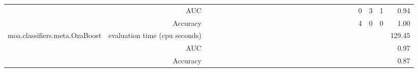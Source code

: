 \documentclass{article}
\providecommand{\tabularnewline}{\\}
\begin{document}
\begin{sidewaystable}
\begin{tabular}{|r|r|rrrrrrrr|r|r|r|r|r|r|r|r|r|r|r|r|r|r|r|r|r|}
 \cline{2-2} \cline{24-27}
 & AUC & \multicolumn{1}{r}{} & \multicolumn{1}{r}{} & \multicolumn{1}{r}{} & \multicolumn{1}{r}{} & \multicolumn{1}{r}{} & \multicolumn{1}{r}{} & \multicolumn{1}{r}{} & \multicolumn{1}{r}{} & \multicolumn{1}{r}{} & \multicolumn{1}{r}{} & \multicolumn{1}{r}{} & \multicolumn{1}{r}{} & \multicolumn{1}{r}{} & \multicolumn{1}{r}{} & \multicolumn{1}{r}{} & \multicolumn{1}{r}{} & \multicolumn{1}{r}{} & \multicolumn{1}{r}{} & \multicolumn{1}{r}{} & \multicolumn{1}{r}{} & \multicolumn{1}{r|}{} & \multicolumn{1}{r|}{0} & \multicolumn{1}{r|}{3} & \multicolumn{1}{r|}{1} & 0.94\tabularnewline
 \cline{2-2} \cline{24-27}
 & Accuracy & \multicolumn{1}{r}{} & \multicolumn{1}{r}{} & \multicolumn{1}{r}{} & \multicolumn{1}{r}{} & \multicolumn{1}{r}{} & \multicolumn{1}{r}{} & \multicolumn{1}{r}{} & \multicolumn{1}{r}{} & \multicolumn{1}{r}{} & \multicolumn{1}{r}{} & \multicolumn{1}{r}{} & \multicolumn{1}{r}{} & \multicolumn{1}{r}{} & \multicolumn{1}{r}{} & \multicolumn{1}{r}{} & \multicolumn{1}{r}{} & \multicolumn{1}{r}{} & \multicolumn{1}{r}{} & \multicolumn{1}{r}{} & \multicolumn{1}{r}{} & \multicolumn{1}{r|}{} & \multicolumn{1}{r|}{4} & \multicolumn{1}{r|}{0} & \multicolumn{1}{r|}{0} & 1.00\tabularnewline
 \cline{1-2} \cline{24-27}
\multirow{3}{*}{moa.classifiers.meta.OzaBoost} & evaluation time (cpu seconds) & \multicolumn{1}{r}{} & \multicolumn{1}{r}{} & \multicolumn{1}{r}{} & \multicolumn{1}{r}{} & \multicolumn{1}{r}{} & \multicolumn{1}{r}{} & \multicolumn{1}{r}{} & \multicolumn{1}{r}{} & \multicolumn{1}{r}{} & \multicolumn{1}{r}{} & \multicolumn{1}{r}{} & \multicolumn{1}{r}{} & \multicolumn{1}{r}{} & \multicolumn{1}{r}{} & \multicolumn{1}{r}{} & \multicolumn{1}{r}{} & \multicolumn{1}{r}{} & \multicolumn{1}{r}{} & \multicolumn{1}{r}{} & \multicolumn{1}{r}{} & \multicolumn{1}{r}{} & \multicolumn{1}{r}{} & \multicolumn{1}{r}{} & \multicolumn{1}{r|}{} & 129.45\tabularnewline
 \cline{2-2} \cline{27-27}
 & AUC & \multicolumn{1}{r}{} & \multicolumn{1}{r}{} & \multicolumn{1}{r}{} & \multicolumn{1}{r}{} & \multicolumn{1}{r}{} & \multicolumn{1}{r}{} & \multicolumn{1}{r}{} & \multicolumn{1}{r}{} & \multicolumn{1}{r}{} & \multicolumn{1}{r}{} & \multicolumn{1}{r}{} & \multicolumn{1}{r}{} & \multicolumn{1}{r}{} & \multicolumn{1}{r}{} & \multicolumn{1}{r}{} & \multicolumn{1}{r}{} & \multicolumn{1}{r}{} & \multicolumn{1}{r}{} & \multicolumn{1}{r}{} & \multicolumn{1}{r}{} & \multicolumn{1}{r}{} & \multicolumn{1}{r}{} & \multicolumn{1}{r}{} & \multicolumn{1}{r|}{} & 0.97\tabularnewline
 \cline{2-2} \cline{27-27}
 & Accuracy & \multicolumn{1}{r}{} & \multicolumn{1}{r}{} & \multicolumn{1}{r}{} & \multicolumn{1}{r}{} & \multicolumn{1}{r}{} & \multicolumn{1}{r}{} & \multicolumn{1}{r}{} & \multicolumn{1}{r}{} & \multicolumn{1}{r}{} & \multicolumn{1}{r}{} & \multicolumn{1}{r}{} & \multicolumn{1}{r}{} & \multicolumn{1}{r}{} & \multicolumn{1}{r}{} & \multicolumn{1}{r}{} & \multicolumn{1}{r}{} & \multicolumn{1}{r}{} & \multicolumn{1}{r}{} & \multicolumn{1}{r}{} & \multicolumn{1}{r}{} & \multicolumn{1}{r}{} & \multicolumn{1}{r}{} & \multicolumn{1}{r}{} & \multicolumn{1}{r|}{} & 0.87\tabularnewline
 \cline{1-27}
\end{tabular}\label{tab:addlabel}
\end{sidewaystable}
\end{document}
